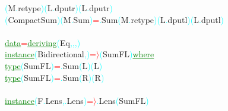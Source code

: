 \textcolor{cyan}{(}{\rm{}M}\textcolor{cyan}{.}{\rm{}retype}\textcolor{cyan}{)}\hsspace \textcolor{cyan}{(}{\rm{}L}\textcolor{cyan}{.}{\rm{}dputr}\textcolor{cyan}{)}\hsspace \textcolor{cyan}{(}{\rm{}L}\textcolor{cyan}{.}{\rm{}dputr}\textcolor{cyan}{)}\\\hsspace \textcolor{cyan}{(}{\rm{}CompactSum}\textcolor{cyan}{)}\hsspace \textcolor{cyan}{(}{\rm{}M}\textcolor{cyan}{.}{\rm{}Sum}\textcolor{cyan}{)}\hsspace \textcolor{red}{=}\textcolor{cyan}{.}{\rm{}Sum}\hsspace \textcolor{cyan}{(}{\rm{}M}\textcolor{cyan}{.}{\rm{}retype}\textcolor{cyan}{)}\hsspace \textcolor{cyan}{(}{\rm{}L}\textcolor{cyan}{.}{\rm{}dputl}\textcolor{cyan}{)}\hsspace \textcolor{cyan}{(}{\rm{}L}\textcolor{cyan}{.}{\rm{}dputl}\textcolor{cyan}{)}\\\\\textcolor{green}{\underline{data}}\hsspace \textcolor{red}{=}\hsspace \textcolor{green}{\underline{deriving}}\hsspace \textcolor{cyan}{(}{\rm{}Eq}\textcolor{cyan}{,}\textcolor{cyan}{,}\textcolor{cyan}{,}\textcolor{cyan}{)}\\\textcolor{green}{\underline{instance}}\hsspace \textcolor{cyan}{(}{\rm{}Bidirectional}\textcolor{cyan}{,}\textcolor{cyan}{)}\hsspace \textcolor{red}{=\ensuremath{\rangle}}\hsspace \textcolor{cyan}{(}{\rm{}SumFL}\textcolor{cyan}{)}\hsspace \textcolor{green}{\underline{where}}\\\hstab \textcolor{green}{\underline{type}}\hsspace \textcolor{cyan}{(}{\rm{}SumFL}\textcolor{cyan}{)}\hsspace \textcolor{red}{=}\textcolor{cyan}{.}{\rm{}Sum}\hsspace \textcolor{cyan}{(}{\rm{}L}\textcolor{cyan}{)}\hsspace \textcolor{cyan}{(}{\rm{}L}\textcolor{cyan}{)}\\\hstab \textcolor{green}{\underline{type}}\hsspace \textcolor{cyan}{(}{\rm{}SumFL}\textcolor{cyan}{)}\hsspace \textcolor{red}{=}\textcolor{cyan}{.}{\rm{}Sum}\hsspace \textcolor{cyan}{(}{\rm{}R}\textcolor{cyan}{)}\hsspace \textcolor{cyan}{(}{\rm{}R}\textcolor{cyan}{)}\\\\\textcolor{green}{\underline{instance}}\hsspace \textcolor{cyan}{(}{\rm{}F}\textcolor{cyan}{.}{\rm{}Lens}\textcolor{cyan}{,}\textcolor{cyan}{.}{\rm{}Lens}\textcolor{cyan}{)}\hsspace \textcolor{red}{=\ensuremath{\rangle}}\textcolor{cyan}{.}{\rm{}Lens}\hsspace \textcolor{cyan}{(}{\rm{}SumFL}\textcolor{cyan}{)}\hsspace 